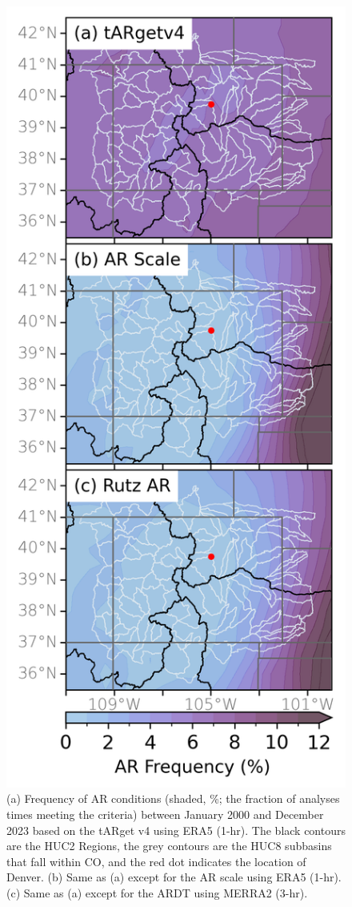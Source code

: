 \documentclass[draft]{agujournal2019}
\begin{document}
\begin{figure}
\noindent\includegraphics[scale=0.85, keepaspectratio]{fig2.png}
\caption{(a) Frequency of AR conditions (shaded, \%; the fraction of analyses times meeting the criteria) between January 2000 and December 2023 based on the  tARget v4 using ERA5 (1-hr). The black contours are the HUC2 Regions, the grey contours are the HUC8 subbasins that fall within CO, and the red dot indicates the location of Denver. (b) Same as (a) except for the AR scale \cite{MartinRalph2019} using ERA5 (1-hr). (c) Same as (a) except for the  ARDT using MERRA2 (3-hr). }
\label{fig:ar_overhead}
\end{figure}
\end{document}
